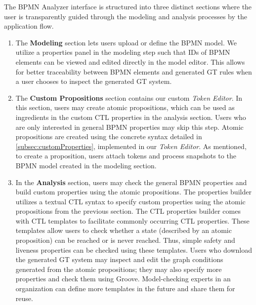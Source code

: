 \documentclass{lmcs} %
\begin{document}

The BPMN Analyzer interface is structured into three distinct sections where the user is transparently guided through the modeling and analysis processes by the application flow.

\begin{enumerate}
  \item The \textbf{Modeling} section lets users upload or define the BPMN model.
  We utilize a properties panel in the modeling step such that IDs of BPMN elements can be viewed and edited directly in the model editor.
  This allows for better traceability between BPMN elements and generated GT rules when a user chooses to inspect the generated GT system.
  \item The \textbf{Custom Propositions} section contains our custom \textit{Token Editor}.
  In this section, users may create atomic propositions, which can be used as ingredients in the custom CTL properties in the analysis section.
  Users who are only interested in general BPMN properties may skip this step.
  Atomic propositions are created using the concrete syntax detailed in \autoref{subsec:customProperties}, implemented in our \textit{Token Editor}.
  As mentioned, to create a proposition, users attach tokens and process snapshots to the BPMN model created in the modeling section.
  \item In the \textbf{Analysis} section, users may check the general BPMN properties and build custom properties using the atomic propositions. 
  The properties builder utilizes a textual CTL syntax to specify custom properties using the atomic propositions from the previous section.
  The CTL properties builder comes with CTL templates to facilitate commonly occurring CTL properties.
  These templates allow users to check whether a state (described by an atomic proposition) can be reached or is never reached.
  Thus, simple safety and liveness properties can be checked using these templates.
  Users who download the generated GT system may inspect and edit the graph conditions generated from the atomic propositions; they may also specify more properties and check them using Groove.
  Model-checking experts in an organization can define more templates in the future and share them for reuse. 
\end{enumerate}
\end{document}
